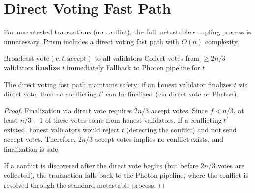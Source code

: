 \section{Direct Voting Fast Path}

\label{sec:voting}

For uncontested transactions (no conflict), the full metastable sampling process is
unnecessary. Prism includes a direct voting fast path with $O(n)$ complexity.

\begin{algorithm}[H]
\caption{Prism Direct Voting --- Uncontested Fast Path}
\label{alg:voting}
\begin{algorithmic}[1]
     
        \State Broadcast $\text{vote}(v, t, \text{accept})$ to all validators
        \State Collect votes from $\geq 2n/3$ validators
            \State \textbf{finalize} $t$ immediately 
        \Else
            \State Fallback to Photon pipeline for $t$ 
        \EndIf
    \EndIf
\EndFunction
\end{algorithmic}
\end{algorithm}

\begin{proposition}
\label{prop:fast-path}
The direct voting fast path maintains safety: if an honest validator finalizes $t$
via direct vote, then no conflicting $t'$ can be finalized (via direct vote or Photon).
\end{proposition}

\begin{proof}
Finalization via direct vote requires $2n/3$ accept votes. Since $f < n/3$, at least
$n/3 + 1$ of these votes come from honest validators. If a conflicting $t'$ existed,
honest validators would reject $t$ (detecting the conflict) and not send accept votes.
Therefore, $2n/3$ accept votes implies no conflict exists, and finalization is safe.

If a conflict is discovered after the direct vote begins (but before $2n/3$ votes are
collected), the transaction falls back to the Photon pipeline, where the conflict is
resolved through the standard metastable process.
\end{proof}

